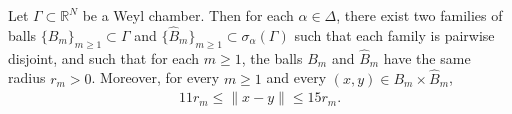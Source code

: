 \documentclass[12pt]{amsart}
\begin{document}
\begin{lemma}\label{constructionball}
Let $\Gamma\subset \mathbb{R}^N$ be a Weyl chamber.
Then for each $\alpha\in \Delta$, there exist two families of balls
$\{B_m\}_{m\ge 1}\subset \Gamma$ and $\{\hat{B}_m\}_{m\ge 1}\subset \sigma_\alpha(\Gamma)$
such that each family is pairwise disjoint, and such that for each $m\ge1$,
the balls $B_m$ and $\hat{B}_m$ have the same radius $r_m>0$.
Moreover, for every $m\ge 1$
and every $(x,y)\in B_m\times \hat{B}_m$,
\begin{align}\label{twosideinequalityrm}
11r_m \le \|x-y\| \le 15r_m.
\end{align}
\end{lemma}
%
\end{document}
